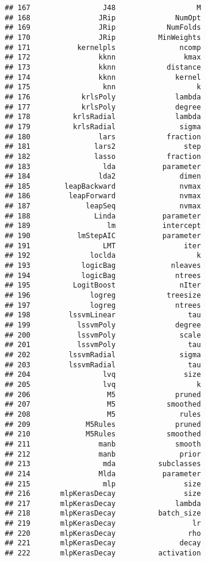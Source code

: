 \documentclass[
]{article}
\begin{document}
\begin{verbatim}
## 167                 J48                   M
## 168                JRip              NumOpt
## 169                JRip            NumFolds
## 170                JRip          MinWeights
## 171           kernelpls               ncomp
## 172                kknn                kmax
## 173                kknn            distance
## 174                kknn              kernel
## 175                 knn                   k
## 176            krlsPoly              lambda
## 177            krlsPoly              degree
## 178          krlsRadial              lambda
## 179          krlsRadial               sigma
## 180                lars            fraction
## 181               lars2                step
## 182               lasso            fraction
## 183                 lda           parameter
## 184                lda2               dimen
## 185        leapBackward               nvmax
## 186         leapForward               nvmax
## 187             leapSeq               nvmax
## 188               Linda           parameter
## 189                  lm           intercept
## 190           lmStepAIC           parameter
## 191                 LMT                iter
## 192              loclda                   k
## 193            logicBag             nleaves
## 194            logicBag              ntrees
## 195          LogitBoost               nIter
## 196              logreg            treesize
## 197              logreg              ntrees
## 198         lssvmLinear                 tau
## 199           lssvmPoly              degree
## 200           lssvmPoly               scale
## 201           lssvmPoly                 tau
## 202         lssvmRadial               sigma
## 203         lssvmRadial                 tau
## 204                 lvq                size
## 205                 lvq                   k
## 206                  M5              pruned
## 207                  M5            smoothed
## 208                  M5               rules
## 209             M5Rules              pruned
## 210             M5Rules            smoothed
## 211                manb              smooth
## 212                manb               prior
## 213                 mda          subclasses
## 214                Mlda           parameter
## 215                 mlp                size
## 216       mlpKerasDecay                size
## 217       mlpKerasDecay              lambda
## 218       mlpKerasDecay          batch_size
## 219       mlpKerasDecay                  lr
## 220       mlpKerasDecay                 rho
## 221       mlpKerasDecay               decay
## 222       mlpKerasDecay          activation

\end{verbatim}
\end{document}
